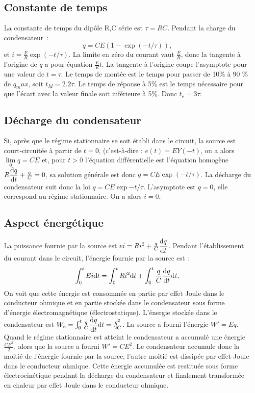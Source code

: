 \subsection{Constante de temps}
La constante de temps du dipôle R,C série est $\tau = RC$. Pendant la charge du condensateur~:
\begin{equation}
q = CE(1 - \exp(-t/\tau)),
\end{equation}
et $i = \frac{E}{R} \exp(-t/\tau)$. La limite en zéro du courant vaut $\frac{E}{R}$, donc la tangente à l'origine de $q$ a pour équation $\frac{E}{R} t$. La tangente à l'origine coupe l'asymptote pour une valeur de $t = \tau$. Le temps de montée est le temps pour passer de 10\% à 90 \% de $q_max$, soit $t_M = 2.2 \tau$. Le temps de réponse à 5\% est le temps nécessaire pour que l'écart avec la valeur finale soit inférieure à 5\%. Donc $t_r = 3 \tau$.

\subsection{Décharge du condensateur}
Si, après que le régime stationnaire se soit établi dans le circuit, la source est court-circuitée à partir de $t = 0$, (c'est-à-dire : $e(t) = E Y(-t)$, on a alors $\lim\limits_{0} q = CE$ et, pour $t > 0$ l'équation différentielle est l'équation homogène $R \dfrac{\mathrm{d} q}{\mathrm{d} t} + \frac{q}{C} = 0$, sa solution générale est donc $q=CE \exp(-t/\tau)$.
La décharge du condensateur suit donc la loi $q=CE \exp{-t/\tau}$. L'asymptote est $q=0$, elle correspond au régime stationnaire. On a alors $i=0$.

\subsection{Aspect énergétique}
La puissance fournie par la source est $ei = Ri^2 + \frac{q}{C} \dfrac{\mathrm{d} q}{\mathrm{d} t}$.
Pendant l'établissement du courant dans le circuit, l'énergie fournie par la source est :
\begin{equation}
\int_0^t Ei \mathrm{d} t = \int_0^t R i^2 \mathrm{d} t + \int_{0}^{t} \frac{q}{C} \dfrac{\mathrm{d} q}{\mathrm{d} t} \mathrm{d} t.
\end{equation}
On voit que cette énergie est consommée en partie par effet Joule dans le conducteur ohmique et en partie stockée dans le condensateur sous forme d'énergie électromagnétique (électrostatique).
L'énergie stockée dans le condensateur est $W_e = \int_{0}^{t} \frac{q}{C} \dfrac{\mathrm{d} q}{\mathrm{d} t} \mathrm{d} t = \frac{q^2}{2C}$. La source a fourni l'énergie $W' = Eq$. Quand le régime stationnaire est atteint le condensateur a accumulé une énergie $\frac{CE^2}{2}$, alors que la source a fourni $W' = C E^2$. Le condensateur accumule donc la moitié de l'énergie fournie par la source, l'autre moitié est dissipée par effet Joule dans le conducteur ohmique. Cette énergie accumulée est restituée sous forme électrocinétique pendant la décharge du condensateur et finalement transformée en chaleur par effet Joule dans le conducteur ohmique. 

